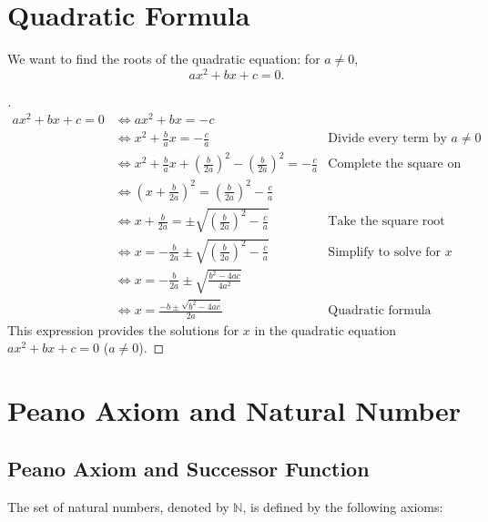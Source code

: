 
\section{Quadratic Formula}
\begin{note}
	We want to find the roots of the quadratic equation: for $a\neq 0$,
	\[
	ax^2 + bx + c = 0.
	\]
	\begin{proof}[\sol]
		\begin{align*}
			ax^2 + bx + c = 0&\iff ax^2 + bx = -c & \\
			&\iff x^2 + \frac{b}{a}x = -\frac{c}{a} & \text{Divide every term by \(a\neq 0\)}\\
			&\iff x^2 + \frac{b}{a}x + \left(\frac{b}{2a}\right)^2 - \left(\frac{b}{2a}\right)^2 = -\frac{c}{a} & \text{Complete the square on the left side} \\
			&\iff \left(x + \frac{b}{2a}\right)^2 = \left(\frac{b}{2a}\right)^2 - \frac{c}{a} & \\
			&\iff x + \frac{b}{2a} = \pm \sqrt{\left(\frac{b}{2a}\right)^2 - \frac{c}{a}}
			& \text{Take the square root on both sides} \\
			&\iff x = -\frac{b}{2a} \pm \sqrt{\left(\frac{b}{2a}\right)^2 - \frac{c}{a}} & \text{Simplify to solve for \(x\)} \\
			&\iff x = -\frac{b}{2a} \pm \sqrt{\frac{b^2 - 4ac}{4a^2}} & \\
			&\iff x = \frac{-b \pm \sqrt{b^2 - 4ac}}{2a} & \text{Quadratic formula}
		\end{align*}
		This expression provides the solutions for \(x\) in the quadratic equation \(ax^2 + bx + c = 0\) ($a\neq 0$).
	\end{proof}
\end{note}

\newpage
\section{Peano Axiom and Natural Number}
\subsection{Peano Axiom and Successor Function}
The set of natural numbers, denoted by \(\mathbb{N}\), is defined by the following axioms:

